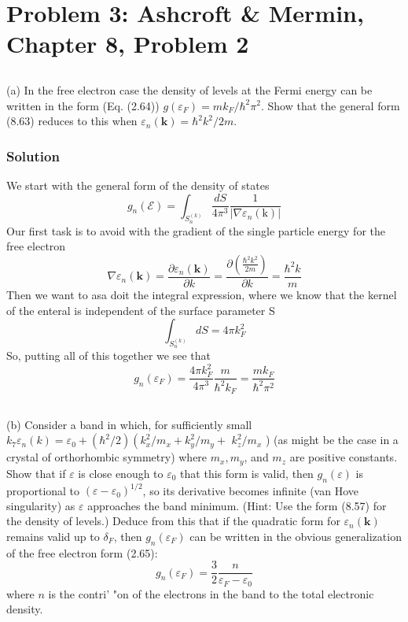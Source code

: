 \documentclass[12pt]{article}
\begin{document}
\section{Problem 3: Ashcroft \& Mermin, Chapter 8, Problem 2}
\subsection{}
(a) In the free electron case the density of levels at the Fermi energy can be written in the form (Eq. (2.64)) $g\left(\varepsilon_F\right)=m k_F / \hbar^2 \pi^2$. Show that the general form (8.63) reduces to this when $\varepsilon_n(\mathbf{k})=\hbar^2 k^2 / 2 m$.
\subsubsection{Solution}
We start with the general form of the density of states
\begin{equation}
g_n(\mathcal{E})=\int_{S_n^{(k)}} \frac{d S}{4 \pi^3} \frac{1}{\left|\nabla \varepsilon_n(\mathrm{k})\right|}
\end{equation}
Our first task is to avoid with the gradient of the single particle energy for the free electron
\begin{equation}
\nabla \varepsilon_n(\mathbf{k}) = \frac{\partial \varepsilon_n(\mathbf{k})}{\partial k} = \frac{\partial \left(\frac{\hbar^2 k^2}{2m}\right)}{\partial k} = \frac{\hbar^2 k}{m}
\end{equation}
Then we want to asa doit the integral expression,  where we know that the kernel of the enteral is independent of the surface parameter S
\begin{equation}
\int_{S_n^{(k)}} dS = 4\pi k_F^2
\end{equation}
So, putting all of this together we see that
\begin{equation}
g_n(\varepsilon_F) = \frac{4\pi k_F^2}{4\pi^3}\frac{m}{\hbar^2 k_F} = \frac{m k_F}{\hbar^2 \pi^2}
\end{equation}
\subsection{}
(b) Consider a band in which, for sufficiently small $k_7 \varepsilon_n(k)=\varepsilon_0+\left(\hbar^2 / 2\right)\left(k_x^2 / m_x+k_y^2 / m_y+\right.$ $k_z^2 / m_x$ ) (as might be the case in a crystal of orthorhombic symmetry) where $m_x, m_y$, and $m_z$ are positive constants. Show that if $\varepsilon$ is close enough to $\varepsilon_0$ that this form is valid, then $g_n(\varepsilon)$ is proportional to $\left(\varepsilon-\varepsilon_0\right)^{1 / 2}$, so its derivative becomes infinite (van Hove singularity) as $\varepsilon$ approaches the band minimum. (Hint: Use the form (8.57) for the density of levels.) Deduce from this that if the quadratic form for $\varepsilon_n(\mathbf{k})$ remains valid up to $\delta_F$, then $g_n\left(\varepsilon_F\right)$ can be written in the obvious generalization of the free electron form (2.65):
$$
g_n\left(\varepsilon_F\right)=\frac{3}{2} \frac{n}{\varepsilon_F-\varepsilon_0}
$$
where $n$ is the contri' "on of the electrons in the band to the total electronic density.
\end{document}
